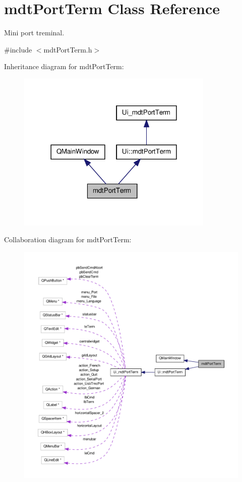 \hypertarget{classmdt_port_term}{\section{mdt\-Port\-Term Class Reference}
\label{classmdt_port_term}
}


Mini port treminal.  




{\ttfamily \#include $<$mdt\-Port\-Term.\-h$>$}



Inheritance diagram for mdt\-Port\-Term\-:\nopagebreak
\begin{figure}[H]
\begin{center}
\leavevmode
\includegraphics[width=266pt]{classmdt_port_term__inherit__graph}
\end{center}
\end{figure}


Collaboration diagram for mdt\-Port\-Term\-:\nopagebreak
\begin{figure}[H]
\begin{center}
\leavevmode
\includegraphics[width=350pt]{classmdt_port_term__coll__graph}
\end{center}
\end{figure}
